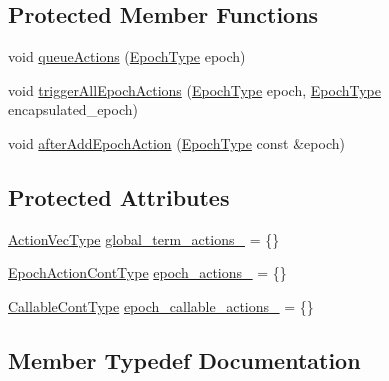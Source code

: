 \subsection*{Protected Member Functions}
\begin{DoxyCompactItemize}
\item 
void \hyperlink{structvt_1_1term_1_1_term_action_a12fe44411dad9ec9564adb12ed82a35f}{queue\+Actions} (\hyperlink{namespacevt_a81d11b28122d43bf9834577e4a06440f}{Epoch\+Type} epoch)
\item 
void \hyperlink{structvt_1_1term_1_1_term_action_a06484cf174bebec361ce93af0f0cdec3}{trigger\+All\+Epoch\+Actions} (\hyperlink{namespacevt_a81d11b28122d43bf9834577e4a06440f}{Epoch\+Type} epoch, \hyperlink{namespacevt_a81d11b28122d43bf9834577e4a06440f}{Epoch\+Type} encapsulated\+\_\+epoch)
\item 
void \hyperlink{structvt_1_1term_1_1_term_action_a873f01594c4c30233ea9a409b2067150}{after\+Add\+Epoch\+Action} (\hyperlink{namespacevt_a81d11b28122d43bf9834577e4a06440f}{Epoch\+Type} const \&epoch)
\end{DoxyCompactItemize}
\subsection*{Protected Attributes}
\begin{DoxyCompactItemize}
\item 
\hyperlink{structvt_1_1term_1_1_term_action_a76d94f79a48ba8367b68f9188784da88}{Action\+Vec\+Type} \hyperlink{structvt_1_1term_1_1_term_action_a2afe34a3835ba57d79d0d1754bbb321e}{global\+\_\+term\+\_\+actions\+\_\+} = \{\}
\item 
\hyperlink{structvt_1_1term_1_1_term_action_acefe3cb1e2a2bcf0d530082f53a2bada}{Epoch\+Action\+Cont\+Type} \hyperlink{structvt_1_1term_1_1_term_action_ac552185f8a4f39d516a7caecd5d89d51}{epoch\+\_\+actions\+\_\+} = \{\}
\item 
\hyperlink{structvt_1_1term_1_1_term_action_a802aaa899ce87dc9f8a53d43b202044c}{Callable\+Cont\+Type} \hyperlink{structvt_1_1term_1_1_term_action_a43bab937874af46a501ccf865336fcb9}{epoch\+\_\+callable\+\_\+actions\+\_\+} = \{\}
\end{DoxyCompactItemize}


\subsection{Member Typedef Documentation}
\mbox{\label{structvt_1_1term_1_1_term_action_aec4a5ca3c0b2d9ae23defb65d27d2984}} 
